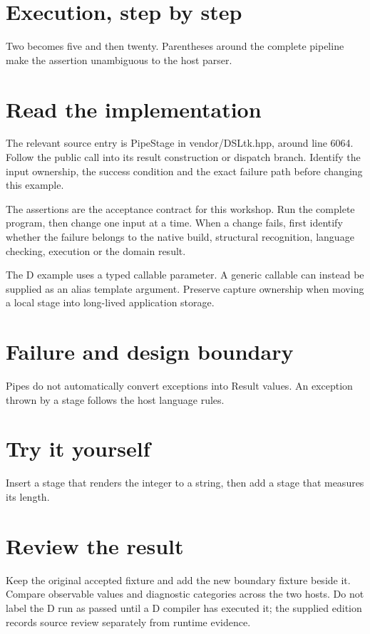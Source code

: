
\section*{Execution, step by step}
Two becomes five and then twenty. Parentheses around the complete pipeline make the assertion unambiguous to the host parser.

\section*{Read the implementation}
The relevant source entry is PipeStage in vendor/DSLtk.hpp, around line 6064. Follow the public call into its result construction or dispatch branch. Identify the input ownership, the success condition and the exact failure path before changing this example.

The assertions are the acceptance contract for this workshop. Run the complete program, then change one input at a time. When a change fails, first identify whether the failure belongs to the native build, structural recognition, language checking, execution or the domain result.

\clearpage
{}
The D example uses a typed callable parameter. A generic callable can instead be supplied as an alias template argument. Preserve capture ownership when moving a local stage into long-lived application storage.


\section*{Failure and design boundary}
Pipes do not automatically convert exceptions into Result values. An exception thrown by a stage follows the host language rules.

\section*{Try it yourself}
Insert a stage that renders the integer to a string, then add a stage that measures its length.

\section*{Review the result}
Keep the original accepted fixture and add the new boundary fixture beside it. Compare observable values and diagnostic categories across the two hosts. Do not label the D run as passed until a D compiler has executed it; the supplied edition records source review separately from runtime evidence.

